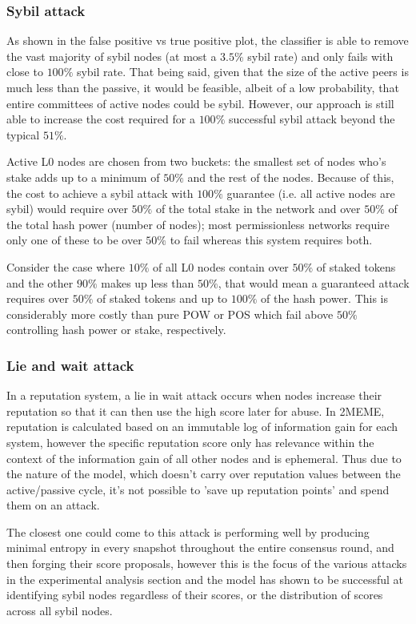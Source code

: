 \documentclass{article}
\begin{document}
\subsubsection{Sybil attack}
As shown in the false positive vs true positive plot, the classifier is able to remove the vast majority of sybil nodes (at most a $3.5\%$ sybil rate) and only fails with close to $100\%$ sybil rate. That being said, given that the size of the active peers is much less than the passive, it would be feasible, albeit of a low probability, that entire committees of active nodes could be sybil. However, our approach is still able to increase the cost required for a $100\%$ successful sybil attack beyond the typical $51\%$. 

Active L0 nodes are chosen from two buckets: the smallest set of nodes who's stake adds up to a minimum of $50\%$ and the rest of the nodes. Because of this, the cost to achieve a sybil attack with $100\%$ guarantee (i.e. all active nodes are sybil) would require over $50\%$ of the total stake in the network and over $50\%$ of the total hash power (number of nodes); most permissionless networks require only one of these to be over $50\%$ to fail whereas this system requires both.

Consider the case where $10\%$ of all L0 nodes contain over $50\%$ of staked tokens and the other $90\%$ makes up less than $50\%$, that would mean a guaranteed attack requires over $50\%$ of staked tokens and up to $100\%$ of the hash power. This is considerably more costly than pure POW or POS which fail above $50\%$ controlling hash power or stake, respectively.

\subsubsection{Lie and wait attack}
In a reputation system, a lie in wait attack occurs when nodes increase their reputation so that it can then use the high score later for abuse. In 2MEME, reputation is calculated based on an immutable log of information gain for each system, however the specific reputation score only has relevance within the context of the information gain of all other nodes and is ephemeral. Thus due to the nature of the model, which doesn't carry over reputation values between the active/passive cycle, it's not possible to 'save up reputation points' and spend them on an attack.

The closest one could come to this attack is performing well by producing minimal entropy in every snapshot throughout the entire consensus round, and then forging their score proposals, however this is the focus of the various attacks in the experimental analysis section and the model has shown to be successful at identifying sybil nodes regardless of their scores, or the distribution of scores across all sybil nodes.
\end{document}
